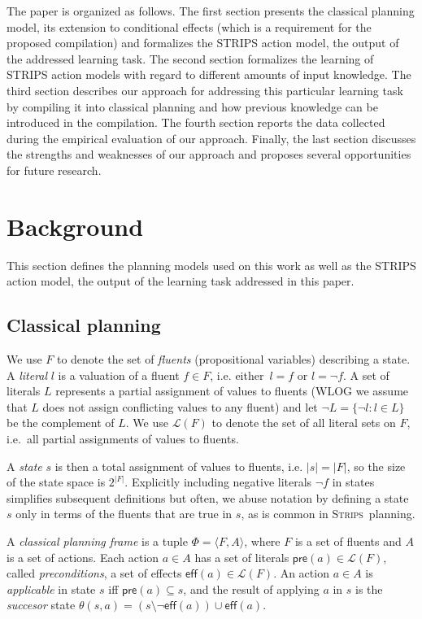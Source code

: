 \documentclass[letterpaper]{article} %
\newcommand{\tup}[1]{{\langle #1 \rangle}}
\newcommand{\pre}{\mathsf{pre}}     %
\newcommand{\eff}{\mathsf{eff}}     %
\newcommand{\strips}{\textsc{Strips}}     %
\begin{document}
The paper is organized as follows. The first section presents the classical planning model, its extension to conditional effects (which is a requirement for the proposed compilation) and formalizes the STRIPS action model, the output of the addressed learning task. The second section formalizes the learning of STRIPS action models with regard to different amounts of input knowledge. The third section describes our approach for addressing this particular learning task by compiling it into classical planning and how previous knowledge can be introduced in the compilation. The fourth section reports the data collected during the empirical evaluation of our approach. Finally, the last section discusses the strengths and weaknesses of our approach and proposes several opportunities for future research. 
 

\section{Background}
This section defines the planning models used on this work as well as the STRIPS action model, the output of the learning task addressed in this paper.

\subsection{Classical planning}
We use $F$ to denote the set of {\em fluents} (propositional variables) describing a state. A {\em literal} $l$ is a valuation of a fluent $f\in F$, i.e. either~$l=f$ or $l=\neg f$. A set of literals $L$ represents a partial assignment of values to fluents (WLOG we assume that $L$ does not assign conflicting values to any fluent) and let $\neg L=\{\neg l:l\in L\}$ be the complement of $L$. We use $\mathcal{L}(F)$ to denote the set of all literal sets on $F$, i.e.~all partial assignments of values to fluents.

A {\em state} $s$ is then a total assignment of values to fluents, i.e. $|s|=|F|$, so the size of the state space is $2^{|F|}$. Explicitly including negative literals $\neg f$ in states simplifies subsequent definitions but often, we abuse notation by defining a state $s$ only in terms of the fluents that are true in $s$, as is common in \strips\ planning.

A {\em classical planning frame} is a tuple $\Phi=\tup{F,A}$, where $F$ is a set of fluents and $A$ is a set of actions. Each action $a\in A$ has a set of literals $\pre(a)\in\mathcal{L}(F)$, called {\em preconditions}, a set of effects $\eff(a)\in\mathcal{L}(F)$. An action $a\in A$ is {\em applicable} in state $s$ iff $\pre(a)\subseteq s$, and the result of applying $a$ in $s$ is the {\em succesor} state $\theta(s,a)=(s\setminus \neg\eff(a))\cup\eff(a)$.
\end{document}
